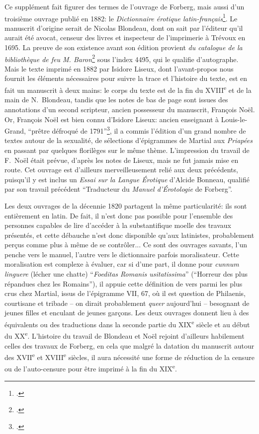 Ce supplément fait figurer des termes de l'ouvrage de Forberg, mais aussi d'un troisième ouvrage publié en 1882: le \textit{Dictionnaire érotique latin-français}\footcite{blondeau_dictionnaire_1885}. Le manuscrit d'origine serait de Nicolas Blondeau, dont on sait par l'éditeur qu'il aurait été avocat, censeur des livres et inspecteur de l'imprimerie à Trévoux en 1695. La preuve de son existence avant son édition provient \textit{du catalogue de la bibliothèque de feu M. Baron}\footcite[Chap. \textit{Belles-Lettres}, p~.2]{noauthor_catalogue_1788} sous l'index 4495, qui le qualifie d'autographe. Mais le texte imprimé en 1882 par Isidore Liseux, dont l'avant-propos nous fournit les éléments nécessaires pour suivre la trace et l'histoire du texte, est en fait un manuscrit à deux mains: le corps du texte est de la fin du XVIII\textsuperscript{e} et de la main de N.~Blondeau, tandis que les notes de bas de page sont issues des annotations d'un second scripteur, ancien possesseur du manuscrit, François Noël. Or, François Noël est bien connu d'Isidore Liseux: ancien enseignant à Louis-le-Grand, \enquote{prêtre défroqué de 1791}\footcite[p.~XVI]{blondeau_dictionnaire_1885}, il a commis l'édition d'un grand nombre de textes autour de la sexualité, de sélections d'épigrammes de Martial aux \textit{Priapées} en passant par quelques florilèges sur le même thème. L'impression du travail de F.~Noël était prévue, d'après les notes de Liseux, mais ne fut jamais mise en route. Cet ouvrage est d'ailleurs merveilleusement relié aux deux précédents, puisqu'il y est inclus un \textit{Essai sur la Langue Érotique} d'Alcide Bonneau, qualifié par son travail précédent \enquote{Traducteur du \textit{Manuel d'Érotologie} de Forberg}.


Les deux ouvrages de la décennie 1820 partagent la même particularité: ils sont entièrement en latin. De fait, il n'est donc pas possible pour l'ensemble des personnes capables de lire d'accéder à la substantifique moelle des travaux présentés, et cette débauche n'est donc disponible qu'aux latinistes, probablement perçus comme plus à même de se contrôler... Ce sont des ouvrages savants, l'un penche vers le manuel, l'autre vers le dictionnaire parfois moralisateur. Cette moralisation est complexe à évaluer, car si d'une part, il donne pour \textit{cunnum linguere} (lécher une chatte) \enquote{\textit{Foeditas Romanis usitatissima}} (\enquote{Horreur des plus répandues chez les Romains}), il appuie cette définition de vers parmi les plus crus chez Martial, issus de l'épigramme VII, 67, où il est question de Philaenis, courtisane et tribade -- on dirait probablement \textit{queer} aujourd'hui -- besognant de jeunes filles et enculant de jeunes garçons. Les deux ouvrages donnent lieu à des équivalents ou des traductions dans la seconde partie du XIX\textsuperscript{e} siècle et au début du XX\textsuperscript{e}. L'histoire du travail de Blondeau et Noël rejoint d'ailleurs habilement celles des travaux de Forberg, en cela que malgré la datation du manuscrit autour des  XVII\textsuperscript{e} et XVIII\textsuperscript{e} siècles, il aura nécessité une forme de réduction de la censure ou de l'auto-censure pour être imprimé à la fin du XIX\textsuperscript{e}.

